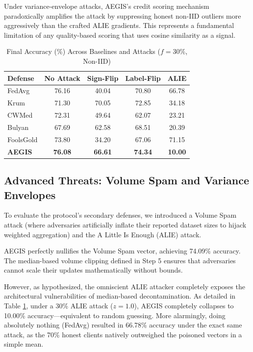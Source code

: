 \documentclass[10pt, conference]{IEEEtran}
\begin{document}
Under variance-envelope attacks, AEGIS's credit scoring mechanism paradoxically amplifies the attack by suppressing honest non-IID outliers more aggressively than the crafted ALIE gradients. This represents a fundamental limitation of any quality-based scoring that uses cosine similarity as a signal.

\begin{table}[htbp]
\centering
\caption{Final Accuracy (\%) Across Baselines and Attacks ($f=30\%$, Non-IID)}
\begin{tabular}{@{}lcccc@{}}
\toprule
\textbf{Defense} & \textbf{No Attack} & \textbf{Sign-Flip} & \textbf{Label-Flip} & \textbf{ALIE} \\ \midrule
FedAvg & 76.16 & 40.04 & 70.80 & 66.78 \\
Krum & 71.30 & 70.05 & 72.85 & 34.18 \\
CWMed & 72.31 & 49.64 & 62.07 & 23.21 \\
Bulyan & 67.69 & 62.58 & 68.51 & 20.39 \\
FoolsGold & 73.80 & 34.20 & 67.06 & 71.15 \\
\textbf{AEGIS} & \textbf{76.08} & \textbf{66.61} & \textbf{74.34} & \textbf{10.00} \\ \bottomrule
\end{tabular}
\label{tab:comparison}
\end{table}

\subsection{Advanced Threats: Volume Spam and Variance Envelopes}
To evaluate the protocol's secondary defenses, we introduced a Volume Spam attack (where adversaries artificially inflate their reported dataset sizes to hijack weighted aggregation) and the A Little Is Enough (ALIE) attack. 

AEGIS perfectly nullifies the Volume Spam vector, achieving 74.09\% accuracy. The median-based volume clipping defined in Step 5 ensures that adversaries cannot scale their updates mathematically without bounds. 

However, as hypothesized, the omniscient ALIE attacker completely exposes the architectural vulnerabilities of median-based decontamination. As detailed in Table \ref{tab:comparison}, under a 30\% ALIE attack ($z=1.0$), AEGIS completely collapses to 10.00\% accuracy—equivalent to random guessing. More alarmingly, doing absolutely nothing (FedAvg) resulted in 66.78\% accuracy under the exact same attack, as the 70\% honest clients natively outweighed the poisoned vectors in a simple mean. 
\end{document}
